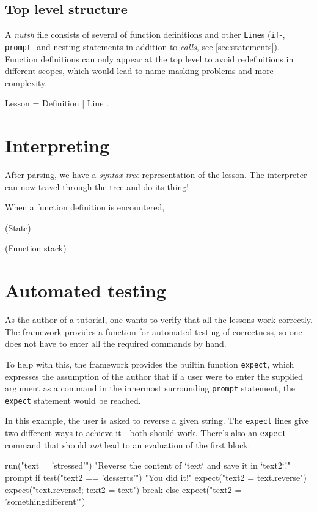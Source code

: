 \documentclass[paper=a4,twoside,abstract=on,cleardoublepage=empty,numbers=noenddot,toc=bib,12pt]{scrreprt}
\begin{document}
\subsection{Top level structure}

A \emph{nutsh} file consists of several of function definitions and other \texttt{Line}s (\texttt{if}-, \texttt{prompt}- and nesting statements in addition to \emph{calls}, see \cref{sec:statements}). Function definitions can only appear at the top level to avoid redefinitions in different scopes, which would lead to name masking problems and more complexity.

\begin{ebnf}
Lesson = { Definition | Line } .
\end{ebnf}

\section{Interpreting}

After parsing, we have a \emph{syntax tree} representation of the lesson. The interpreter can now travel through the tree and do its thing!

When a function definition is encountered, 

(State)

(Function stack)

\section{Automated testing}

As the author of a tutorial, one wants to verify that all the lessons work correctly. The framework provides a function for automated testing of correctness, so one does not have to enter all the required commands by hand.

To help with this, the framework provides the builtin function \texttt{expect}, which expresses the assumption of the author that if a user were to enter the supplied argument as a command in the innermost surrounding \texttt{prompt} statement, the \texttt{expect} statement would be reached.

In this example, the user is asked to reverse a given string. The \texttt{expect} lines give two different ways to achieve it---both should work. There's also an \texttt{expect} command that should \emph{not} lead to an evaluation of the first block:

\begin{nutsh}
run("text = 'stressed'")
"Reverse the content of `text` and save it in `text2`!"
prompt {
    if test("text2 == 'desserts'") {
        "You did it!"
        expect("text2 = text.reverse")
        expect("text.reverse!; text2 = text")
        break
    } else {
        expect("text2 = 'somethingdifferent'")
    }
}
\end{nutsh}
\end{document}
